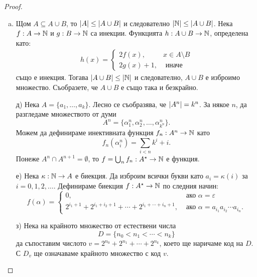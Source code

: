 \begin{proof}
  \begin{enumerate}[a)]
  \item
    Щом $A \subseteq A\cup B$, то $\lvert{A}\rvert \leq \lvert{A\cup B}\rvert$ и следователно
    $\lvert{\mathbb{N}}\rvert \leq \lvert{A\cup B}\rvert$.
    Нека $f:A\to \mathbb{N}$ и $g:B\to\mathbb{N}$ са инекции.
    Функцията $h:A\cup B\to \mathbb{N}$, определена като:
    \begin{align*}
      h(x) = 
      \begin{cases}
        2f(x), & x \in A\setminus B\\
        2g(x) + 1, & \mbox{ иначе}
      \end{cases}
    \end{align*}
    също е инекция.
    Тогава $\lvert{A\cup B}\rvert \leq \lvert{\mathbb{N}}\rvert$ и следователно, 
    $A\cup B$ е изброимо множество. 
    Съобразете, че $A\cup B$ е също така и безкрайно.
  \item[д)]
    Нека $A = \{a_1,\dots,a_k\}$.
    Лесно се съобразява, че $\lvert{A^n}\rvert = k^n$.
    За някое $n$, да разгледаме множеството от думи 
    \[A^n = \{\alpha^n_{1},\alpha^n_{2},\dots, \alpha^n_{{k^n}}\}.\]
    Можем да дефинираме инективната функция $f_n : A^n \to \mathbb{N}$ като
    \[f_n(\alpha^n_{i}) = \sum_{i<n} k^i + i.\]
    Понеже $A^n \cap A^{n+1} = \emptyset$, 
    то $f = \bigcup_n f_n : A^\star \to \mathbb{N}$ е функция.
  \item[е)]
    Нека $\kappa:\mathbb{N} \to A$ е биекция.
    Да изброим всички букви като $a_i = \kappa(i)$ за $i = 0,1,2,\dots$.
    Дефинираме биекция $f:A^\star \to \mathbb{N}$ по следния начин:
    \[
    f(\alpha) = 
    \begin{cases}
      0,                             & \text{ ако } \alpha = \varepsilon\\
      2^{i_1+1} + 2^{i_1+i_2+1} + \cdots + 2^{i_1+\cdots+i_n+1}, & \text{ ако } \alpha = a_{i_1}a_{i_2}\cdots a_{i_n}.
    \end{cases}
    \]
  \item[з)]
    Нека на крайното множество от естествени числа
    \[D = \{n_0 < n_1 < \cdots < n_k\}\]
    да съпоставим числото $v = 2^{n_0} + 2^{n_1} + \cdots + 2^{n_k}$, което ще наричаме код на $D$.
    С $D_v$ ще означаваме крайното множество с код $v$.
    

\end{enumerate}
\end{proof}
